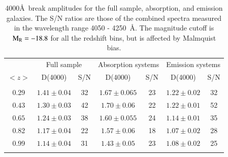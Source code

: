 \documentclass[referee]{aa}
\begin{document}
\begin{table}
\renewcommand{\arraystretch}{0.9}
\centering 
\caption{  4000\AA\  break amplitudes for the full sample, absorption, and emission galaxies. 
The S/N ratios are those of the combined spectra measured in the wavelength range  4050 - 4250~\AA. The magnitude cutoff is
 $\rm M_R = -18.8$ for all the redshift bins, but is affected by Malmquist bias.}
\begin{tabular}{ c c c c c c c}
      & \multicolumn{2}{c}{Full sample} & \multicolumn{2}{c}{Absorption systems} & \multicolumn{2}{c}{Emission systems} \\
$<z>$ &  D(4000)               & S/N & D(4000)                 & S/N  & D(4000)          & S/N   \\ \hline
& & & & \\
 0.29    & $1.41 \pm 0.04$     & 32  & $1.67 \pm 0.065$          & 23   &  $1.22 \pm 0.02$ & 32       \\
$ 0.43$  & $1.30 \pm 0.03$     & 42  & $1.70 \pm 0.06$        & 22   &  $1.22 \pm 0.01$ & 52      \\
$0.65$   & $1.24 \pm 0.03$     & 38  & $1.60 \pm 0.055$           & 24   &  $1.14 \pm 0.01$ & 35      \\
0.82     & $1.17 \pm 0.04$     & 22  & $1.57 \pm 0.06$      & 18   &  $1.07 \pm 0.02$ & 28      \\     
0.99     & $1.14 \pm 0.04$     & 31  & $1.43 \pm 0.05$         & 23   &  $1.08 \pm 0.02$ & 25      \\
\hline \hline
\label{D4000}
\end{tabular}
\end{table}

%
%
\end{document}
